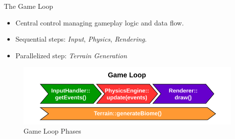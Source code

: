 
\begin{frame}{The Game Loop}
    \begin{itemize}
        \item Central control managing gameplay logic and data flow.
        \item Sequential steps: \textit{Input}, \textit{Physics}, \textit{Rendering}.
        \item Parallelized step: \textit{Terrain Generation} 
    \end{itemize}
    \begin{figure}
        \centering
        \includegraphics[width=0.8\linewidth]{../figures/physics/gameLoop.pdf}
        \caption{Game Loop Phases}
    \end{figure}
\end{frame}